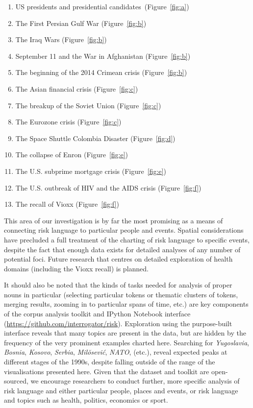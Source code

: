     \begin{enumerate} \setlength\itemsep{0em}
    \item US presidents and presidential candidates~(Figure~\ref{fig:a})
    \item The First Persian Gulf War (Figure~\ref{fig:b})                   
    \item The Iraq Wars (Figure~\ref{fig:b})
    \item September 11 and the War in Afghanistan (Figure~\ref{fig:b})   
    \item The beginning of the 2014 Crimean crisis (Figure~\ref{fig:b})       
    \item The Asian financial crisis (Figure~\ref{fig:c})
    \item The breakup of the Soviet Union (Figure~\ref{fig:c})
    \item The Eurozone crisis (Figure~\ref{fig:c})
    \item The Space Shuttle Colombia Disaster (Figure~\ref{fig:d})
    \item The collapse of Enron (Figure~\ref{fig:e})
    \item The U.S. subprime mortgage crisis  (Figure~\ref{fig:e})
    \item The U.S. outbreak of HIV and the AIDS crisis (Figure~\ref{fig:f})
    \item The recall of Vioxx (Figure~\ref{fig:f})
    \end{enumerate}
    This area of our investigation is by far the most promising as a means of connecting risk language to particular people and events. Spatial considerations have precluded a full treatment of the charting of risk language to specific events, despite the fact that enough data exists for detailed analyses of any number of potential foci. Future research that centres on detailed exploration of health domains (including the Vioxx recall) is planned.

    It should also be noted that the kinds of tasks needed for analysis of proper nouns in particular (selecting particular tokens or thematic clusters of tokens, merging results, zooming in to particular spans of time, etc.) are key components of the corpus analysis toolkit and IPython Notebook interface (\url{https://github.com/interrogator/risk}). Exploration using the purpose-built interface reveals that many topics are present in the data, but are hidden by the frequency of the very prominent examples charted here. Searching for \emph{Yugoslavia}, \emph{Bosnia}, \emph{Kosovo}, \emph{Serbia}, \emph{Mil{\u o}sevi{\'c}}, \emph{\textsc{NATO}}, (etc.), reveal expected peaks at different stages of the 1990s, despite falling outside of the range of the visualisations presented here. Given that the dataset and toolkit are open-sourced, we encourage researchers to conduct further, more specific analysis of risk language and either particular people, places and events, or risk language and topics such as health, politics, economics or sport.

